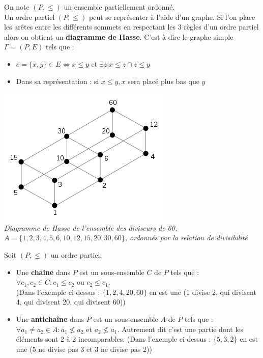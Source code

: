 \documentclass[11pt]{article}
\begin{document}
		On note $(P,\leq)$ un ensemble partiellement ordonné.\\ %
		
		Un ordre partiel $(P,\leq)$ peut se représenter à l'aide d'un graphe. Si l'on place les arêtes entre les différents sommets en respectant les 3 règles d'un ordre partiel alors on obtient un \textbf{diagramme de Hasse}. C'est à dire le graphe simple $\Gamma = (P,E)$ tels que :
		\begin{itemize}
			\item $e = \{x,y\} \in E \Leftrightarrow x \leq y$ et $\exists z | x \leq z \cap z \leq y$
			\item Dans sa représentation : si $x \leq y, x$ sera placé plus bas que $y$
		\end{itemize}
		
		\begin{center}
		\includegraphics[scale=0.65]{ordre_partiel.png}\\
		\textit{Diagramme de Hasse de l'ensemble des diviseurs de 60, $A = \{1, 2, 3, 4, 5, 6, 10, 12, 15, 20, 30, 60\}$, ordonnés par la relation de divisibilité}
		\end{center}
		
		Soit  $(P, \leq)$ un ordre partiel:
		\begin{itemize}
			\item Une \textbf{chaine} dans $P$ est un sous-ensemble $C$ de $P$ tels que :\\
			$\forall c_1,c_2 \in C : c_1 \leq c_2$ ou $c_2 \leq c_1$.\\
			(Dans l'exemple ci-dessus : $\{1,2,4,20,60\}$ en est une (1 divise 2, qui divisent 4, qui divisent 20, qui divisent  60))
			\item Une \textbf{antichaîne} dans $P$ est un sous-ensemble $A$ de $P$ tels que :\\
			$\forall a_1 \neq a_2 \in A : a_1 \not\leq a_2$ et $a_2 \not\leq a_1$. Autrement dit c'est une partie dont les éléments sont 2 à 2 incomparables.
			(Dans l'exemple ci-dessus : $\{5,3,2\}$ en est une (5 ne divise pas 3 et 3 ne divise pas 2))\\
		\end{itemize}
		
\end{document}
